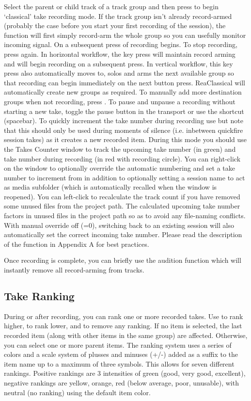\documentclass[10pt,american]{article}
\begin{document}
Select the parent or child track of a track group and then press  to
begin `classical' take recording mode. If the track group isn't already
record-armed (probably the case before you start your first recording of the
session), the function will first simply record-arm the whole group so you can
usefully monitor incoming signal. On a subsequent press of  recording
begins. To stop recording, press  again. In horizontal workflow, the
key press will maintain record arming and will begin recording on a subsequent
press. In vertical workflow, this key press also automatically moves to, solos
and arms the next available group so that recording can begin immediately on the
next button press. ReaClassical will automatically create new groups as
required. To manually add more destination groups when not recording, press
\keys{\textbackslash}. To pause and unpause a recording without starting a new
take, toggle the pause button in the transport or use the shortcut
\keys{\ctrl+\space} (spacebar). To quickly increment the take number during
recording use  but note that this should only be used during
moments of silence (i.e. inbetween quickfire session takes) as it creates a new
recorded item. During this mode you should use the Takes Counter window
\keys{\ctrl+\enter} to track the upcoming take number (in green) and take number
during recording (in red with recording circle). You can right-click on the
window to optionally override the automatic numbering and set a take number to
increment from in addition to optionally setting a session name to act as media
subfolder (which is automatically recalled when the window is reopened). You can
left-click to recalculate the track count if you have removed some unused files
from the project path. The calculated upcoming take number factors in unused
files in the project path so as to avoid any file-naming conflicts. With manual
override off (=0), switching back to an existing session will also automatically
set the correct incoming take number. Please read the description of the
function in Appendix A for best practices.

Once recording is complete, you can briefly use the audition function 
which will instantly remove all record-arming from tracks.

\subsection{Take Ranking}

During or after recording, you can rank one or more recorded takes. Use
\keys{\ctrl+=} to rank higher, \keys{\ctrl+-} to rank lower, and 
to remove any ranking. If no item is selected, the last recorded item (along
with other items in the same group) are affected. Otherwise, you can select one
or more parent items. The ranking system uses a series of colors and a scale
system of plusses and minuses (+/-) added as a suffix to the item name up to a
maximum of three symbols. This allows for seven different rankings. Positive
rankings are 3 intensities of green (good, very good, excellent), negative
rankings are yellow, orange, red (below average, poor, unusable), with neutral
(no ranking) using the default item color.
\end{document}

